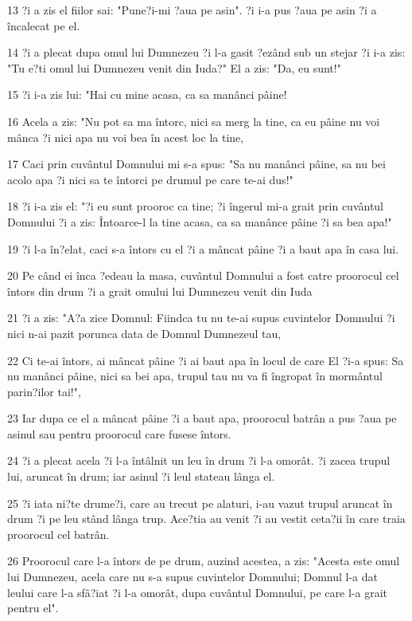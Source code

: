 \par 13 ?i a zis el fiilor sai: "Pune?i-mi ?aua pe asin". ?i i-a pus ?aua pe asin ?i a încalecat pe el.
\par 14 ?i a plecat dupa omul lui Dumnezeu ?i l-a gasit ?ezând sub un stejar ?i i-a zis: "Tu e?ti omul lui Dumnezeu venit din Iuda?" El a zis: "Da, eu sunt!"
\par 15 ?i i-a zis lui: "Hai cu mine acasa, ca sa manânci pâine!
\par 16 Acela a zis: "Nu pot sa ma întorc, nici sa merg la tine, ca eu pâine nu voi mânca ?i nici apa nu voi bea în acest loc la tine,
\par 17 Caci prin cuvântul Domnului mi s-a spus: "Sa nu manânci pâine, sa nu bei acolo apa ?i nici sa te întorci pe drumul pe care te-ai dus!"
\par 18 ?i i-a zis el: "?i eu sunt prooroc ca tine; ?i îngerul mi-a grait prin cuvântul Domnului ?i a zis: Întoarce-l la tine acasa, ca sa manânce pâine ?i sa bea apa!"
\par 19 ?i l-a în?elat, caci s-a întors cu el ?i a mâncat pâine ?i a baut apa în casa lui.
\par 20 Pe când ei înca ?edeau la masa, cuvântul Domnului a fost catre proorocul cel întors din drum ?i a grait omului lui Dumnezeu venit din Iuda
\par 21 ?i a zis: "A?a zice Domnul: Fiindca tu nu te-ai supus cuvintelor Domnului ?i nici n-ai pazit porunca data de Domnul Dumnezeul tau,
\par 22 Ci te-ai întors, ai mâncat pâine ?i ai baut apa în locul de care El ?i-a spus: Sa nu manânci pâine, nici sa bei apa, trupul tau nu va fi îngropat în mormântul parin?ilor tai!",
\par 23 Iar dupa ce el a mâncat pâine ?i a baut apa, proorocul batrân a pus ?aua pe asinul sau pentru proorocul care fusese întors.
\par 24 ?i a plecat acela ?i l-a întâlnit un leu în drum ?i l-a omorât. ?i zacea trupul lui, aruncat în drum; iar asinul ?i leul stateau lânga el.
\par 25 ?i iata ni?te drume?i, care au trecut pe alaturi, i-au vazut trupul aruncat în drum ?i pe leu stând lânga trup. Ace?tia au venit ?i au vestit ceta?ii în care traia proorocul cel batrân.
\par 26 Proorocul care l-a întors de pe drum, auzind acestea, a zis: "Acesta este omul lui Dumnezeu, acela care nu s-a supus cuvintelor Domnului; Domnul l-a dat leului care l-a sfâ?iat ?i l-a omorât, dupa cuvântul Domnului, pe care l-a grait pentru el".
